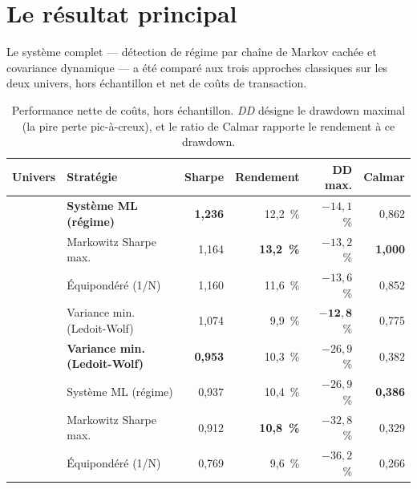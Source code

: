 \section{Le résultat principal}

Le système complet — détection de régime par chaîne de Markov cachée et
covariance dynamique — a été comparé aux trois approches classiques sur les deux
univers, hors échantillon et net de coûts de transaction.

\begin{table}[htbp]
  \centering
  \caption[Performance comparée, hors échantillon]{Performance nette de coûts,
  hors échantillon. \emph{DD} désigne le drawdown maximal (la pire perte
  pic-à-creux), et le ratio de Calmar rapporte le rendement à ce drawdown.}
  \label{tab:headline}
  \small
  \begin{tabular}{llrrrr}
    \toprule
    Univers & Stratégie & Sharpe & Rendement & DD max. & Calmar \\
    \midrule
      & \textbf{Système ML (régime)}      & \textbf{1,236} & 12,2~\% & $-14{,}1$~\% & 0,862 \\
      & Markowitz Sharpe max.             & 1,164 & \textbf{13,2~\%} & $-13{,}2$~\% & \textbf{1,000} \\
      & Équipondéré (1/N)                 & 1,160 & 11,6~\% & $-13{,}6$~\% & 0,852 \\
      & Variance min. (Ledoit-Wolf)       & 1,074 &  9,9~\% & $\mathbf{-12{,}8}$~\% & 0,775 \\
    \midrule
      & \textbf{Variance min. (Ledoit-Wolf)} & \textbf{0,953} & 10,3~\% & $-26{,}9$~\% & 0,382 \\
      & Système ML (régime)               & 0,937 & 10,4~\% & $-26{,}9$~\% & \textbf{0,386} \\
      & Markowitz Sharpe max.             & 0,912 & \textbf{10,8~\%} & $-32{,}8$~\% & 0,329 \\
      & Équipondéré (1/N)                 & 0,769 &  9,6~\% & $-36{,}2$~\% & 0,266 \\
    \bottomrule
  \end{tabular}
\end{table}

